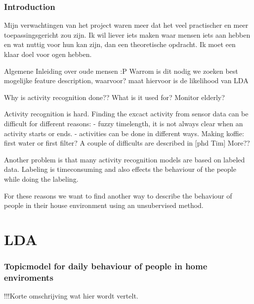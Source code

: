 \documentclass[11pt,a4paper]{report}
\begin{document}
\section{Introduction}

Mijn verwachtingen van het project waren meer dat het veel practischer en meer toepassingsgericht zou zijn. Ik wil liever iets maken waar mensen iets aan hebben en wat nuttig voor hun kan zijn, dan een theoretische opdracht.
Ik moet een klaar doel voor ogen hebben.

Algemene Inleiding over oude mensen :P
Warrom is dit nodig
we zoeken  best mogelijke feature description, waarvoor?
maat hiervoor is de likelihood van LDA



Why is activity recognition done?? What is it used for?
Monitor elderly?

Activity recognition is hard. Finding the excact activity from sensor data can be difficult for different reasons:
- fuzzy timelength, it is not always clear when an activity starts or ends.
- activities can be done in different ways. Making koffie: first water or first filter?
A couple of difficults are described in [phd Tim] More??

Another problem is that many activity recognition models are based on labeled data. Labeling is timeconsuming and also effects the behaviour of the people while doing the labeling.

For these reasons we want to find another way to describe the behaviour of people in their house environment using an unsubervised method.



\part{LDA}
\section{Topicmodel for daily behaviour of people in home enviroments}
!!!Korte omschrijving wat hier wordt vertelt.
\end{document}

